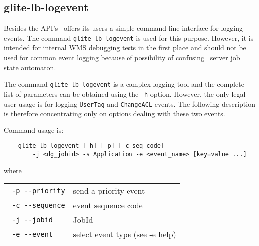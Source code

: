 %
%
\subsection{glite-lb-logevent}
\label{glite-lb-logevent}

Besides the API's \LB\ offers its users a simple command-line interface for
logging events. The command \verb'glite-lb-logevent' is used for this purpose.
However, it is intended for internal WMS debugging tests in the first place and
should not be used for common event logging because of possibility of confusing
\LB\ server job state automaton.

The command \verb'glite-lb-logevent' is a complex logging tool and the complete
list of parameters can be obtained using the \verb'-h' option.  However,
the only legal user usage is for logging \verb'UserTag' and \verb'ChangeACL'
events. The following description is therefore concentrating only on options
dealing with these two events.

Command usage is:

\begin{verbatim}
    glite-lb-logevent [-h] [-p] [-c seq_code] 
        -j <dg_jobid> -s Application -e <event_name> [key=value ...]
\end{verbatim}

where

\begin{tabularx}{\textwidth}{lX}
\texttt{  -p  -{}-priority} &       send a priority event\\
\texttt{  -c  -{}-sequence} &       event sequence code\\
\texttt{  -j  -{}-jobid} &          JobId\\
\texttt{  -e  -{}-event} &           select event type (see -e help)\\
\end{tabularx}

